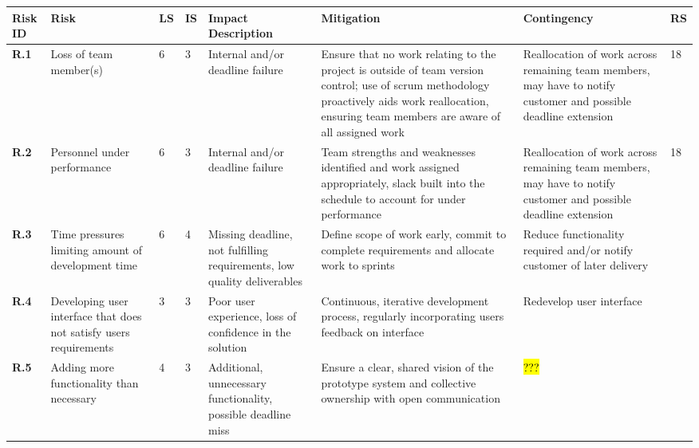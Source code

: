 \begin{longtable}[H]{| p{0.65cm} | p{2cm} | p{0.3cm} | p{0.3cm} | p{2.4cm} | p{3cm} | p{2.7cm} | p{0.4cm} |}
  \hline
  \cellcolor{titleColor}\textbf{Risk ID} &
  \cellcolor{titleColor}\textbf{Risk} &
  \cellcolor{titleColor}\textbf{LS} &
  \cellcolor{titleColor}\textbf{IS} &
  \cellcolor{titleColor}\textbf{Impact Description} &
  \cellcolor{titleColor}\textbf{Mitigation} &
  \cellcolor{titleColor}\textbf{Contingency} &
  \cellcolor{titleColor}\textbf{RS}\\
  
  \hline \textbf{R.1}
  & Loss of team member(s)
  & 6
  & 3
  & Internal and/or deadline failure
  & Ensure that no work relating to the project is outside of team
  version control; use of scrum methodology proactively aids work
  reallocation, ensuring team members are aware of all assigned work
  & Reallocation of work across remaining team members, may have to notify customer and possible deadline extension
  & 18 \\
  
  \hline \textbf{R.2}
  & Personnel under performance
  & 6
  & 3
  & Internal and/or deadline failure
  & Team strengths and weaknesses identified and work assigned appropriately, slack built into the schedule to account for under performance
  & Reallocation of work across remaining team members, may have to notify customer and possible deadline extension
  & 18 \\
  
  \hline \textbf{R.3}
  & Time pressures limiting amount of development time
  & 6
  & 4
  & Missing deadline, not fulfilling requirements, low quality deliverables
  & Define scope of work early, commit to complete requirements and allocate work to sprints 
  & Reduce functionality required and/or notify customer of later delivery
  & \\
  
  \hline \textbf{R.4}
  & Developing user interface that does not satisfy users requirements
  & 3
  & 3
  & Poor user experience, loss of confidence in the solution
  & Continuous, iterative development process, regularly incorporating users feedback on interface
  & Redevelop user interface
  & \\
  
  \hline \textbf{R.5}
  & Adding more functionality than necessary
  & 4
  & 3
  & Additional, unnecessary functionality, possible deadline miss
  & Ensure a clear, shared vision of the prototype system and collective ownership with open communication
  & \hl{???}
  & \\
  

\end{longtable}
